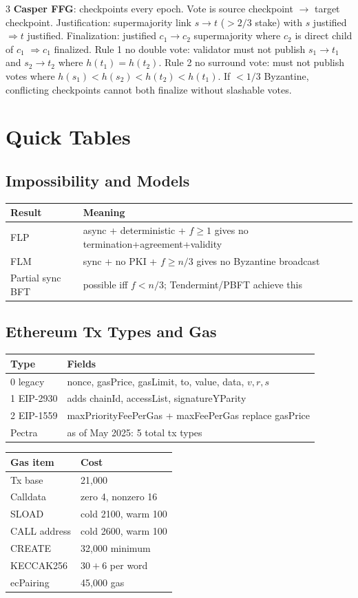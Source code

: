 \documentclass[8pt]{extarticle}
\newcommand{\term}[1]{\textbf{#1}}
\begin{document}
\begin{multicols*}{3}
\term{Casper FFG}: checkpoints every epoch. Vote is source checkpoint $\to$ target checkpoint. Justification: supermajority link $s\to t$ ($>2/3$ stake) with $s$ justified $\Rightarrow t$ justified. Finalization: justified $c_1\to c_2$ supermajority where $c_2$ is direct child of $c_1$ $\Rightarrow c_1$ finalized. Rule 1 no double vote: validator must not publish $s_1\to t_1$ and $s_2\to t_2$ where $h(t_1)=h(t_2)$. Rule 2 no surround vote: must not publish votes where $h(s_1)<h(s_2)<h(t_2)<h(t_1)$. If $<1/3$ Byzantine, conflicting checkpoints cannot both finalize without slashable votes.

\section{Quick Tables}
\subsection{Impossibility and Models}
\begin{tabularx}{\linewidth}{@{}lX@{}}
\toprule
Result & Meaning\\
\midrule
FLP & async + deterministic + $f\ge1$ gives no termination+agreement+validity\\
FLM & sync + no PKI + $f\ge n/3$ gives no Byzantine broadcast\\
Partial sync BFT & possible iff $f<n/3$; Tendermint/PBFT achieve this\\
\bottomrule
\end{tabularx}

\subsection{Ethereum Tx Types and Gas}
\begin{tabularx}{\linewidth}{@{}lX@{}}
\toprule
Type & Fields\\
\midrule
0 legacy & nonce, gasPrice, gasLimit, to, value, data, $v,r,s$\\
1 EIP-2930 & adds chainId, accessList, signatureYParity\\
2 EIP-1559 & maxPriorityFeePerGas + maxFeePerGas replace gasPrice\\
Pectra & as of May 2025: 5 total tx types\\
\bottomrule
\end{tabularx}
\begin{tabularx}{\linewidth}{@{}lX@{}}
\toprule
Gas item & Cost\\
\midrule
Tx base & 21,000\\
Calldata & zero 4, nonzero 16\\
SLOAD & cold 2100, warm 100\\
CALL address & cold 2600, warm 100\\
CREATE & 32,000 minimum\\
KECCAK256 & $30+6$ per word\\
ecPairing & 45,000 gas\\
\bottomrule
\end{tabularx}


\end{multicols*}
\end{document}
